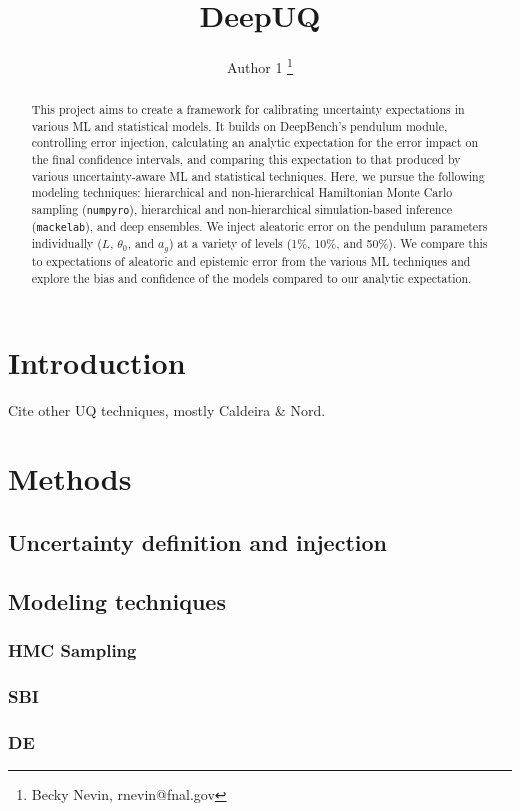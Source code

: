 \documentclass[twocolumn]{aastex631}
\begin{document}
\title{DeepUQ} %

\author{Author 1 \thanks{Becky Nevin, rnevin@fnal.gov}}


\begin{abstract}
    This project aims to create a framework for calibrating uncertainty expectations in various ML and statistical models.
    It builds on DeepBench's pendulum module, controlling error injection, calculating an analytic expectation for the error impact on the final confidence intervals, and comparing this expectation to that produced by various uncertainty-aware ML and statistical techniques.
    Here, we pursue the following modeling techniques: hierarchical and non-hierarchical Hamiltonian Monte Carlo sampling (\texttt{numpyro}), hierarchical and non-hierarchical simulation-based inference (\texttt{mackelab}), and deep ensembles.
    We inject aleatoric error on the pendulum parameters individually ($L$, $\theta_0$, and $a_g$) at a variety of levels (1\%, 10\%, and 50\%).
    We compare this to expectations of aleatoric and epistemic error from the various ML techniques and explore the bias and confidence of the models compared to our analytic expectation.
\end{abstract}

\section{Introduction}
Cite other UQ techniques, mostly Caldeira \& Nord.

\section{Methods}
\subsection{Uncertainty definition and injection}
\subsection{Modeling techniques}
\subsubsection{HMC Sampling}
\subsubsection{SBI}
\subsubsection{DE}
\end{document}
